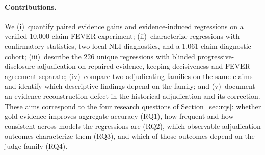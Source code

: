 \paragraph{Contributions.}
We (i)~quantify paired evidence gains and evidence-induced regressions on a verified 10{,}000-claim FEVER experiment;
(ii)~characterize regressions with confirmatory statistics, two local NLI diagnostics, and a 1{,}061-claim diagnostic cohort;
(iii)~describe the 226 unique regressions with blinded progressive-disclosure adjudication on repaired evidence, keeping decisiveness and FEVER agreement separate;
(iv)~compare two adjudicating families on the same claims and identify which descriptive findings depend on the family; and
(v)~document an evidence-reconstruction defect in the historical adjudication and its correction.
These aims correspond to the four research questions of Section~\ref{sec:rqs}: whether gold evidence improves aggregate accuracy (RQ1), how frequent and how consistent across models the regressions are (RQ2), which observable adjudication outcomes characterize them (RQ3), and which of those outcomes depend on the judge family (RQ4).

